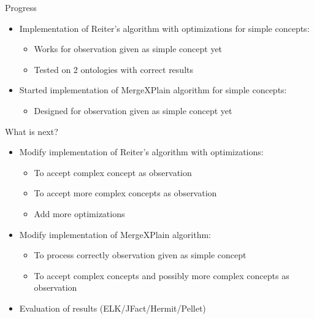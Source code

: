 \documentclass{beamer}
\begin{document}
\begin{frame}{Progress}
	\begin{itemize}
		\item Implementation of Reiter's algorithm with optimizations for simple concepts:

		\begin{itemize}
			\item Works for observation given as simple concept yet
			\item Tested on 2 ontologies with correct results
		\end{itemize}		

		\item Started implementation of MergeXPlain algorithm for simple concepts:

		\begin{itemize}
			\item Designed for observation given as simple concept yet
		\end{itemize}
	\end{itemize}
\end{frame}

\begin{frame}{What is next?}
	\begin{itemize}		
		\item Modify implementation of Reiter's algorithm with optimizations:
		\begin{itemize}
			\item To accept complex concept as observation
			\item To accept more complex concepts as observation
			\item Add more optimizations
		\end{itemize}
		
		\item Modify implementation of MergeXPlain algorithm:
		\begin{itemize}
			\item To process correctly observation given as simple concept
			\item To accept complex concepts and possibly more complex concepts as observation
		\end{itemize}		
		\item {
			Evaluation of results (ELK/JFact/Hermit/Pellet)
		}		
	\end{itemize}
\end{frame}
\end{document}
